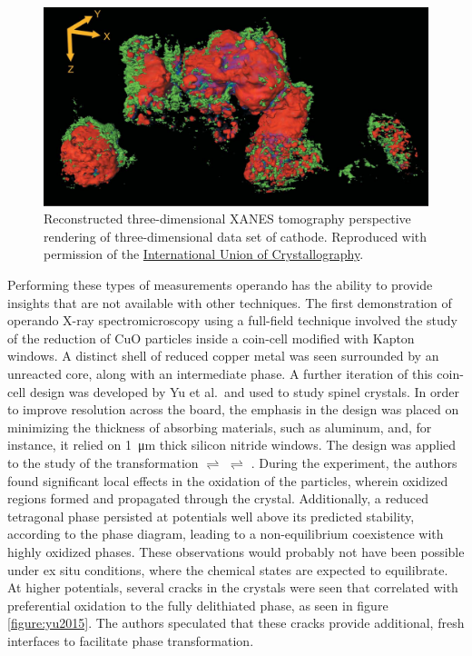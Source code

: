 \documentclass[journal=cmatex,manuscript=perspective]{achemso}
\newcommand{\iucr}{Reproduced with permission of the
  \href{http://journals.iucr.org/}{International Union of
    Crystallography}.}
\begin{document}
\begin{figure}
  \includegraphics[width=\textwidth]{meirer2011.png}
  \caption{Reconstructed three-dimensional XANES tomography
    perspective rendering of three-dimensional data set of 
    cathode.\cite{meirer2011} \iucr}
  \label{figure:meirer2011}
\end{figure}

Performing these types of measurements operando has the ability to
provide insights that are not available with other techniques. The
first demonstration of operando X-ray spectromicroscopy using a
full-field technique involved the study of the reduction of CuO
particles inside a coin-cell modified with Kapton
windows\cite{wang2013}. A distinct shell of reduced copper metal was
seen surrounded by an unreacted  core, along with an
intermediate  phase. A further iteration of this coin-cell
design was developed by Yu et al.\ and used to study 
spinel crystals. In order to improve resolution across the board, the
emphasis in the design was placed on minimizing the thickness of
absorbing materials, such as aluminum, and, for instance, it relied on
\SI{1}{\micro\meter} thick silicon nitride windows. The design was
applied to the study of the transformation 
$\rightleftharpoons$  $\rightleftharpoons$
\cite{ohzuku1990}. During the experiment, the authors found
significant local effects in the oxidation of the particles, wherein
oxidized  regions formed and propagated through the
crystal. Additionally, a reduced tetragonal  phase
persisted at potentials well above its predicted stability, according
to the phase diagram, leading to a non-equilibrium coexistence with
highly oxidized phases. These observations would probably not have
been possible under ex situ conditions, where the chemical states are
expected to equilibrate. At higher potentials, several cracks in the
crystals were seen that correlated with preferential oxidation to the
fully delithiated  phase, as seen in figure
\ref{figure:yu2015}. The authors speculated that these cracks provide
additional, fresh interfaces to facilitate phase
transformation\cite{yu2015}.
\end{document}
